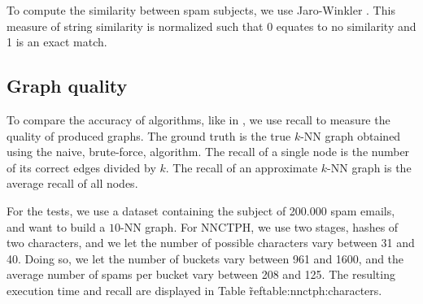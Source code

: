 \documentclass[wcp]{jmlr}
\begin{document}
To compute the similarity between spam subjects, we use Jaro-Winkler \cite{winkler90}. This measure of string similarity is normalized such that 0 equates to no similarity and 1 is an exact match.

\subsection{Graph quality}

To compare the accuracy of algorithms, like in \cite{Dong2011}, we use recall to measure the quality of produced graphs. The ground truth is the true $k$-NN graph obtained using the naive, brute-force, algorithm. The recall of a single node is the number of its correct edges divided by $k$. The recall of an approximate $k$-NN graph is the average recall of all nodes.

For the tests, we use a dataset containing the subject of 200.000 spam emails, and want to build a $10$-NN graph. For NNCTPH, we use two stages, hashes of two characters, and we let the number of possible characters vary between 31 and 40. Doing so, we let the number of buckets vary between 961 and 1600, and the average number of spams per bucket vary between 208 and 125. The resulting execution time and recall are displayed in Table \~ref{table:nnctph:characters}.
\end{document}
